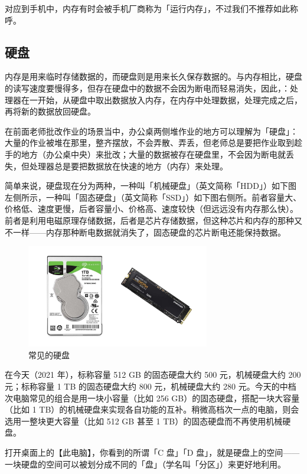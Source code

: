 \begin{note}
  对应到手机中，内存有时会被手机厂商称为「运行内存」，不过我们不推荐如此称呼。
\end{note}

\subsection{硬盘}

内存是用来临时存储数据的，而硬盘则是用来长久保存数据的。与内存相比，硬盘的读写速度要慢得多，但存在硬盘中的数据不会因为断电而轻易消失，因此，：处理器在一开始，从硬盘中取出数据放入内存，在内存中处理数据，处理完成之后，再将新的数据放回硬盘。

在前面老师批改作业的场景当中，办公桌两侧堆作业的地方可以理解为「硬盘」：大量的作业被堆在那里，整齐摆放，不会弄散、弄丢，但老师总是要把作业取到趁手的地方（办公桌中央）来批改；大量的数据被存在硬盘里，不会因为断电就丢失，但处理器总是要把数据放在快速的地方（内存）来处理。

简单来说，硬盘现在分为两种，一种叫「机械硬盘」（英文简称「HDD」）如下图左侧所示，一种叫「固态硬盘」（英文简称「SSD」）如下图右侧所。前者容量大、价格低、速度更慢，后者容量小、价格高、速度较快（但远远没有内存那么快）。前者是利用电磁原理存储数据，后者是芯片存储数据，但这种芯片和内存的那种又不一样——内存那种断电数据就消失了，固态硬盘的芯片断电还能保持数据。

\begin{figure}[H]
  \centering
  \includegraphics[width=8cm]{assets/Disks.jpg}
  \caption{常见的硬盘}
  \label{disks}
\end{figure}

在今天（2021 年），标称容量 512 GB 的固态硬盘大约 500 元，机械硬盘大约 200 元；标称容量 1 TB 的固态硬盘大约 800 元，机械硬盘大约 280 元。今天的中档次电脑常见的组合是用一块小容量（比如 256 GB）的固态硬盘，搭配一块大容量（比如 1 TB）的机械硬盘来实现各自功能的互补。稍微高档次一点的电脑，则会选用一整块更大容量（比如 512 GB 甚至 1 TB）的固态硬盘而不再使用机械硬盘。

打开桌面上的【此电脑】，你看到的所谓「C 盘」「D 盘」，就是硬盘上的空间——一块硬盘的空间可以被划分成不同的「盘」（学名叫「分区」）来更好地利用。

